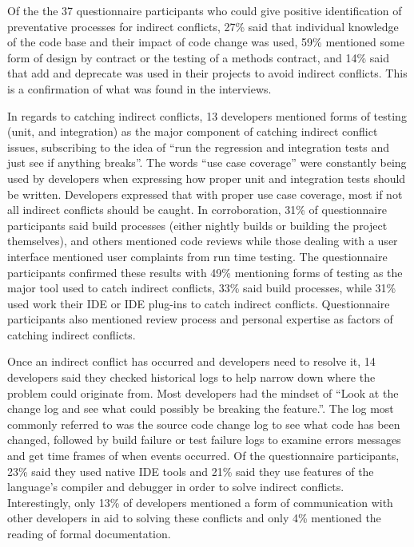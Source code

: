 \documentclass[conference]{IEEEtran}
\begin{document}
Of the the 37 questionnaire participants who could give positive identification of preventative processes for indirect conflicts,
27\% said that individual knowledge of the code base and their impact of code change was used, 59\% mentioned some form of design
by contract or the testing of a methods contract, and 14\% said that add and
deprecate was used in their projects to avoid indirect conflicts. This is a confirmation of what was found in the interviews.

In regards to catching indirect conflicts, 13 developers mentioned forms of testing (unit, and integration)
as the major component of catching indirect conflict issues, subscribing to the idea of ``run the regression and integration
tests and just see if anything breaks''. The words ``use case coverage'' were constantly being used by developers
when expressing how proper unit and integration tests should be written. Developers expressed that with proper use case coverage, most if
not all indirect conflicts should be caught. In corroboration, 31\% of questionnaire participants said build processes (either nightly builds or building the project
themselves), and others mentioned code reviews while those dealing with a user interface mentioned user complaints from run
time testing. The questionnaire participants confirmed these results with 49\% mentioning forms of testing as the major tool used to
catch indirect conflicts, 33\% said build processes, while 31\% used work their IDE or IDE plug-ins to catch indirect conflicts.
Questionnaire participants also mentioned review process and personal expertise as factors of catching indirect conflicts.

Once an indirect conflict has occurred and developers need to resolve it, 14 developers said
they checked historical logs to help narrow down where the problem could originate from. Most developers had the mindset of
``Look at the change log and see what could possibly be breaking the feature.''. The log most commonly referred to was the source
code change log to see what code has been changed, followed by build failure or test failure logs to examine errors messages and get time
frames of when events occurred. Of the questionnaire participants, 23\% said they used native IDE tools and 21\% said they use
features of the language's compiler and debugger in order to solve indirect conflicts. Interestingly, only 13\% of developers
mentioned a form of communication with other developers in aid to solving these conflicts and only 4\% mentioned the reading
of formal documentation.
\end{document}
